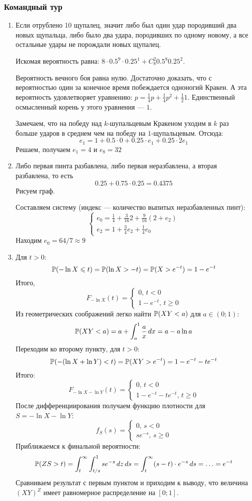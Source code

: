\subsubsection*{Командный тур}

\begin{enumerate}
\item Если отрублено 10 щупалец, значит либо был один удар породивший два новых
щупальца, либо было два удара, породивших по одному новому, а все остальные удары
не порождали новых щупалец.

Искомая вероятность равна: $8\cdot 0.5^9 \cdot 0.25^1 + C_8^2 0.5^8 0.25^2$.

Вероятность вечного боя равна нулю. Достаточно доказать, что с вероятностью один
за конечное время побеждается одноногий Кракен. А эта вероятность удовлетворяет
уравнению: $p=\frac{1}{4}p + \frac{1}{4}p^2 + \frac{1}{2} 1$. Единственный осмысленный
корень у этого уравнения — $1$.

Замечаем, что на победу над $k$-шупальцевым Кракеном уходим в $k$ раз больше ударов
в среднем чем на победу на $1$-щупальцевым. Отсюда:
\[
e_1=1 + 0.5\cdot 0 + 0.25\cdot e_1 + 0.25 \cdot 2e_1
\]
Решаем, получаем $e_1=4$ и $e_8=32$

\item Либо первая пинта разбавлена, либо первая неразбавлена, а вторая разбавлена,
то есть
\[
0.25 + 0.75\cdot 0.25 =0.4375
\]
Рисуем граф. %

Составляем систему (индекс — количество выпитых неразбавленных пинт):
\[
\begin{cases}
e_0=\frac{1}{4} + \frac{3}{16}2 + \frac{9}{16}(2+e_2) \\
e_2=1+\frac{3}{4}e_2 + \frac{1}{4}e_0
\end{cases}
\]
Находим $e_0=64/7\approx 9$

\item Для $t>0$:
\[
\P(-\ln X \leq t)=\P(\ln X > -t)=\P(X > e^{-t})=1-e^{-t}
\]
Итого,
\[
F_{-\ln X}(t)=\begin{cases}
0, \, t < 0 \\
1-e^{-t}, \, t \geq 0
\end{cases}
\]
Из геометрических соображений легко найти $\P(XY < a)$ для $a\in (0;1)$:
\[
\P(XY < a)=a + \int_a^1 \frac{a}{x} \, dx=a-a\ln a
\]
Переходим ко второму пункту, для $t>0$:
\[
\P(-(\ln X + \ln Y) < t)=\P(XY > e^{-t})= 1-e^{-t} -t e^{-t}
\]
Итого:
\[
F_{-\ln X - \ln Y}(t)=\begin{cases}
0, \, t < 0 \\
1-e^{-t} - te^{-t}, \, t \geq 0
\end{cases}
\]
После дифференциирования получаем функцию плотности для $S=-\ln X - \ln Y$:
\[
f_S(s)=\begin{cases}
0, \, s < 0 \\
se^{-s}, \, s \geq 0
\end{cases}
\]
Приближаемся к финальной вероятности:
\[
\P(ZS > t)= \int_t^{\infty} \int_{t/s}^1  se^{-s} \, dz\, ds=
\int_t^{\infty} (s-t)\cdot e^{-s} \, ds= \ldots = e^{-t}
\]
Сравниваем результат с первым пунктом и приходим к выводу, что величина $(XY)^Z$
имеет равномерное распределение на $[0;1]$.


\end{enumerate}
